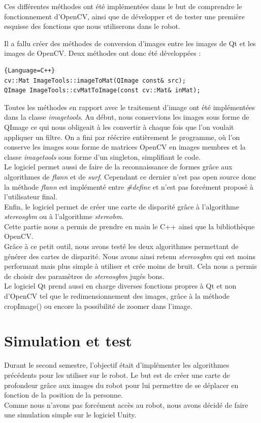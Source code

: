 \documentclass[12pt,a4paper]{report}
\begin{document}
Ces différentes méthodes ont été implémentées dans le but de comprendre le fonctionnement d'OpenCV, ainsi que de développer et de tester une première esquisse des fonctions que nous utiliserons dans le robot.

Il a fallu créer des méthodes de conversion d'images entre les images de Qt et les images de OpenCV. Deux méthodes ont donc été développées : 

\begin{lstlisting}{Language=C++}
cv::Mat ImageTools::imageToMat(QImage const& src);
QImage ImageTools::cvMatToImage(const cv::Mat& inMat);
\end{lstlisting}

Toutes les méthodes en rapport avec le traitement d'image ont été implémentées dans la classe \textit{imagetools}. Au début, nous conservions les images sous forme de QImage ce qui nous obligeait à les convertir à chaque fois que l'on voulait appliquer un filtre. On a fini par réécrire entièrement le programme, où l'on conserve les images sous forme de matrices OpenCV en images membres et la classe \textit{imagetools} sous forme d'un singleton, simplifiant le code.\\
Le logiciel permet aussi de faire de la reconnaissance de formes grâce aux algorithmes de \textit{flann} et de \textit{surf}. Cependant ce dernier n'est pas open source donc la méthode \textit{flann} est implémenté entre \textit{\#define} et n'est pas forcément proposé à l'utilisateur final.\\
Enfin, le logiciel permet de créer une carte de disparité grâce à l'algorithme \textit{stereosgbm} ou à l'algorithme \textit{stereobm}.\\

Cette partie nous a permis de prendre en main le C++ ainsi que la bibliothèque OpenCV.\\

Grâce à ce petit outil, nous avons testé les deux algorithmes permettant de générer des cartes de disparité. Nous avons ainsi retenu \textit{stereosgbm} qui est moins performant mais plus simple à utiliser et crée moins de bruit. Cela nous a permis de choisir des paramètres de \textit{stereosgbm} jugés bons.\\

Le logiciel Qt prend aussi en charge diverses fonctions propres à Qt et non d'OpenCV tel que le redimensionnement des images, grâce à la méthode cropImage() ou encore la possibilité de zoomer dans l'image.

\section{Simulation et test}
Durant le second semestre, l'objectif était d'implémenter les algorithmes précédents pour les utiliser sur le robot. Le but est de créer une carte de profondeur grâce aux images du robot pour lui permettre de se déplacer en fonction de la position de la personne.\\
Comme nous n'avons pas forcément accès au robot, nous avons décidé de faire une simulation simple sur le logiciel Unity.\\
\end{document}
